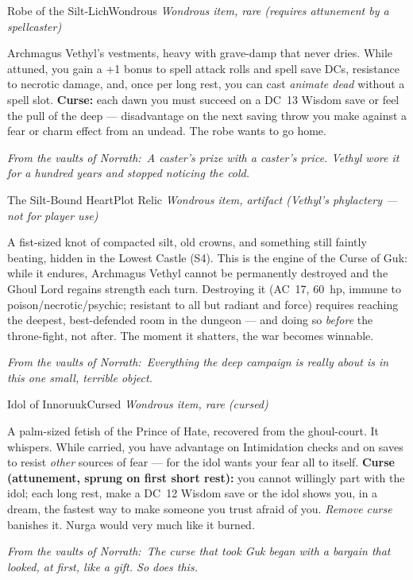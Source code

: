 \documentclass[10pt,twoside]{report}
\newcommand{\itemtype}[1]{{\itshape #1}\par\vspace{2pt}{\color{gukgold!70!black}\rule{\linewidth}{0.6pt}}\par\vspace{2pt}}
\newcommand{\eqnote}[1]{\par\vspace{3pt}{\color{gukgold!70!black}\rule{\linewidth}{0.5pt}}\par
  {\footnotesize\itshape\color{gukstone}From the vaults of Norrath:~#1}\par}
\newcommand{\dc}[1]{DC~#1}
\begin{document}
\begin{itemcard}{Robe of the Silt-Lich}{Wondrous}
\itemtype{Wondrous item, rare (requires attunement by a spellcaster)}
Archmagus Vethyl's vestments, heavy with grave-damp that never dries. While attuned, you gain a +1 bonus to spell attack rolls and spell save DCs, resistance to necrotic damage, and, once per long rest, you can cast \emph{animate dead} without a spell slot. \textbf{Curse:} each dawn you must succeed on a \dc{13} Wisdom save or feel the pull of the deep --- disadvantage on the next saving throw you make against a fear or charm effect from an undead. The robe wants to go home.
\eqnote{A caster's prize with a caster's price. Vethyl wore it for a hundred years and stopped noticing the cold.}
\end{itemcard}

\begin{itemcard}{The Silt-Bound Heart}{Plot Relic}
\itemtype{Wondrous item, artifact (Vethyl's phylactery --- not for player use)}
A fist-sized knot of compacted silt, old crowns, and something still faintly beating, hidden in the Lowest Castle (S4). This is the engine of the Curse of Guk: while it endures, Archmagus Vethyl cannot be permanently destroyed and the Ghoul Lord regains strength each turn. Destroying it (AC~17, 60~hp, immune to poison/necrotic/psychic; resistant to all but radiant and force) requires reaching the deepest, best-defended room in the dungeon --- and doing so \emph{before} the throne-fight, not after. The moment it shatters, the war becomes winnable.
\eqnote{Everything the deep campaign is really about is in this one small, terrible object.}
\end{itemcard}

\begin{itemcard}{Idol of Innoruuk}{Cursed}
\itemtype{Wondrous item, rare (cursed)}
A palm-sized fetish of the Prince of Hate, recovered from the ghoul-court. It whispers. While carried, you have advantage on Intimidation checks and on saves to resist \emph{other} sources of fear --- for the idol wants your fear all to itself. \textbf{Curse (attunement, sprung on first short rest):} you cannot willingly part with the idol; each long rest, make a \dc{12} Wisdom save or the idol shows you, in a dream, the fastest way to make someone you trust afraid of you. \emph{Remove curse} banishes it. Nurga would very much like it burned.
\eqnote{The curse that took Guk began with a bargain that looked, at first, like a gift. So does this.}
\end{itemcard}
\end{document}
